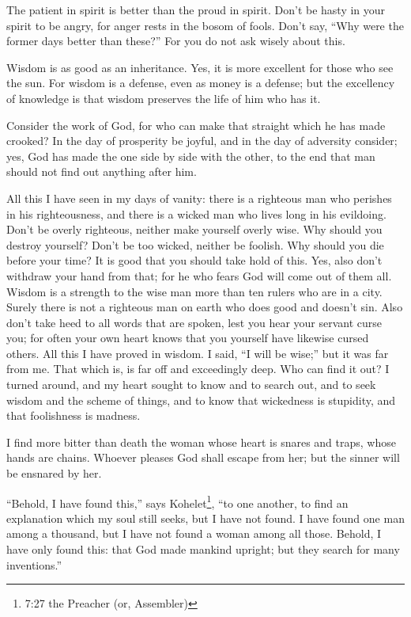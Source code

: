 The patient in spirit is better than the proud in spirit.
\myverse{}Don’t be hasty in your spirit to be angry, for anger rests in the bosom of fools.
\myverse{}Don’t say, “Why were the former days better than these?” For you do not ask
wisely about this.

\myverse{}Wisdom is as good as an inheritance. Yes, it is more excellent
for those who see the sun.
\myverse{}For wisdom is a defense, even as money is a defense; but the excellency of
knowledge is that wisdom preserves the life of him who has it.

\myverse{}Consider the work of God, for who can make that straight which
he has made crooked?
\myverse{}In the day of prosperity be joyful, and in the day of adversity consider;
yes, God has made the one side by side with the other, to the end that man should not find out anything
after him.

\myverse{}All this I have seen in my days of vanity: there is a righteous
man who perishes in his righteousness, and there is a wicked man who lives long in his evildoing.
\myverse{}Don’t be overly righteous, neither make yourself overly wise. Why should you
destroy yourself?
\myverse{}Don’t be too wicked, neither be foolish. Why should you die before your time?
\myverse{}It is good that you should take hold of this. Yes, also don’t withdraw your
hand from that; for he who fears God will come out of them all.
\myverse{}Wisdom is a strength to the wise man more than ten rulers who are in a city.
\myverse{}Surely there is not a righteous man on earth who does good and doesn’t sin.
\myverse{}Also don’t take heed to all words that are spoken, lest you hear your servant
curse you;
\myverse{}for often your own heart knows that you yourself have likewise cursed others.
\myverse{}All this I have proved in wisdom. I said, “I will be wise;” but it was far
from me.
\myverse{}That which is, is far off and exceedingly deep. Who can find it out?
\myverse{}I turned around, and my heart sought to know and to search out, and to seek
wisdom and the scheme of things, and to know that wickedness is stupidity, and that foolishness is madness.

\myverse{}I find more bitter than death the woman whose heart is snares
and traps, whose hands are chains. Whoever pleases God shall escape from her; but the sinner will be ensnared
by her.

\myverse{}“Behold, I have found this,” says Kohelet\footnote{7:27 the Preacher (or, Assembler)},
“to one another, to find an explanation
\myverse{}which my soul still seeks, but I have not found. I have found one man among
a thousand, but I have not found a woman among all those.
\myverse{}Behold, I have only found this: that God made mankind upright; but they search
for many inventions.”



